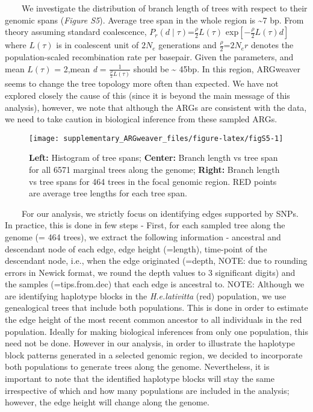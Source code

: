 \documentclass[
]{article}
\begin{document}
  We investigate the distribution of branch length of trees with respect
to their genomic spans (\emph{Figure S5}). Average tree span in the
whole region is \textasciitilde7 bp. From theory assuming standard
coalescence, \(P_r(d \mid \tau)\)=\(\frac {\rho}{2}L(\tau)\)
exp\([-\frac {\rho}{2}L(\tau) d]\) where \(L(\tau)\) is in coalescent
unit of \(2N_e\) generations and \(\frac {\rho}{2}\)=\(2N_er\) denotes
the population-scaled recombination rate per basepair. Given the
parameters, and mean \(L(\tau)\) = 2,mean \emph{d} =
\(\frac {1} {\frac {\rho}{2}L(\tau)}\) should be \textasciitilde{} 45bp.
In this region, ARGweaver seems to change the tree topology more often
than expected. We have not explored closely the cause of this (since it
is beyond the main message of this analysis), however, we note that
although the ARGs are consistent with the data, we need to take caution
in biological inference from these sampled ARGs.

\begin{figure}

{\centering \texttt{[image: supplementary\_ARGweaver\_files/figure-latex/figS5-1]} 

}

\caption{\textbf{Left:} Histogram of tree spans; \textbf{Center:} Branch length vs tree span for all 6571 marginal trees along the genome; \textbf{Right:} Branch length vs tree spans for 464 trees in the focal genomic region. RED points are average tree lengths for each tree span.}\label{fig:figS5}
\end{figure}

  For our analysis, we strictly focus on identifying edges supported by
SNPs. In practice, this is done in few steps - First, for each sampled
tree along the genome (= 464 trees), we extract the following
information - ancestral and descendant node of each edge, edge height
(=length), time-point of the descendant node, i.e., when the edge
originated (=depth, NOTE: due to rounding errors in Newick format, we
round the depth values to 3 significant digits) and the samples
(=tips.from.dec) that each edge is ancestral to. NOTE: Although we are
identifying haplotype blocks in the \emph{H.e.lativitta} (red)
population, we use genealogical trees that include both populations.
This is done in order to estimate the edge height of the most recent
common ancestor to all individuals in the red population. Ideally for
making biological inferences from only one population, this need not be
done. However in our analysis, in order to illustrate the haplotype
block patterns generated in a selected genomic region, we decided to
incorporate both populations to generate trees along the genome.
Nevertheless, it is important to note that the identified haplotype
blocks will stay the same irrespective of which and how many populations
are included in the analysis; however, the edge height will change along
the genome.
\end{document}
